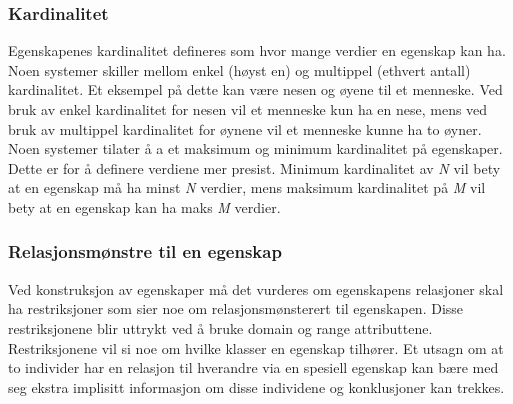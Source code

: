 \subsubsection{Kardinalitet}
Egenskapenes kardinalitet defineres som hvor mange verdier en egenskap kan ha. Noen systemer skiller mellom enkel (høyst en) og multippel (ethvert antall) kardinalitet. Et eksempel på dette kan være nesen og øyene til et menneske. Ved bruk av enkel kardinalitet for nesen vil et menneske kun ha en nese, mens ved bruk av multippel kardinalitet for øynene vil et menneske kunne ha to øyner. \\
Noen systemer tilater å a et maksimum og minimum kardinalitet på egenskaper. Dette er for å definere verdiene mer presist. Minimum kardinalitet av \textit{N} vil bety at en egenskap må ha minst \textit{N} verdier, mens maksimum kardinalitet på \textit{M} vil bety at en egenskap kan ha maks \textit{M} verdier. \\

\subsubsection{Relasjonsmønstre til en egenskap}
Ved konstruksjon av egenskaper må det vurderes om egenskapens relasjoner skal ha restriksjoner som sier noe om relasjonsmønsterert til egenskapen. Disse restriksjonene blir uttrykt ved å bruke domain og range attributtene. Restriksjonene vil si noe om hvilke klasser en egenskap tilhører. Et utsagn om at to individer har en relasjon til hverandre via en spesiell egenskap kan bære med seg ekstra implisitt informasjon om disse individene og konklusjoner kan trekkes.


